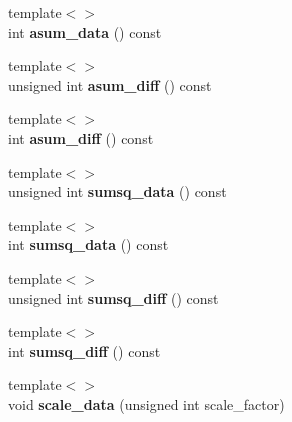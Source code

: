 \begin{DoxyCompactItemize}
\item 
{\footnotesize template$<$$>$ }\\int {\bfseries asum\+\_\+data} () const\hypertarget{classcaffe_1_1Blob_a7104c5eb03f4307dd65bb098ad4c1a66}{}\label{classcaffe_1_1Blob_a7104c5eb03f4307dd65bb098ad4c1a66}

\item 
{\footnotesize template$<$$>$ }\\unsigned int {\bfseries asum\+\_\+diff} () const\hypertarget{classcaffe_1_1Blob_aba736c86a9d3bdc798bcc6551725f9a9}{}\label{classcaffe_1_1Blob_aba736c86a9d3bdc798bcc6551725f9a9}

\item 
{\footnotesize template$<$$>$ }\\int {\bfseries asum\+\_\+diff} () const\hypertarget{classcaffe_1_1Blob_a1725a104ce88a7eb466f1d1fb3f9cf95}{}\label{classcaffe_1_1Blob_a1725a104ce88a7eb466f1d1fb3f9cf95}

\item 
{\footnotesize template$<$$>$ }\\unsigned int {\bfseries sumsq\+\_\+data} () const\hypertarget{classcaffe_1_1Blob_acac953b71e67c041755151f78a20405f}{}\label{classcaffe_1_1Blob_acac953b71e67c041755151f78a20405f}

\item 
{\footnotesize template$<$$>$ }\\int {\bfseries sumsq\+\_\+data} () const\hypertarget{classcaffe_1_1Blob_a91285b7a182d4927520b7d1ede18ed20}{}\label{classcaffe_1_1Blob_a91285b7a182d4927520b7d1ede18ed20}

\item 
{\footnotesize template$<$$>$ }\\unsigned int {\bfseries sumsq\+\_\+diff} () const\hypertarget{classcaffe_1_1Blob_a71f00f3e867e4ebccd30fb261f5109a2}{}\label{classcaffe_1_1Blob_a71f00f3e867e4ebccd30fb261f5109a2}

\item 
{\footnotesize template$<$$>$ }\\int {\bfseries sumsq\+\_\+diff} () const\hypertarget{classcaffe_1_1Blob_a4edc021fb188ee25d0113a167858c5ec}{}\label{classcaffe_1_1Blob_a4edc021fb188ee25d0113a167858c5ec}

\item 
{\footnotesize template$<$$>$ }\\void {\bfseries scale\+\_\+data} (unsigned int scale\+\_\+factor)\hypertarget{classcaffe_1_1Blob_af90e5b5950b5002ae75243e988a5cfe2}{}\label{classcaffe_1_1Blob_af90e5b5950b5002ae75243e988a5cfe2}


\end{DoxyCompactItemize}
